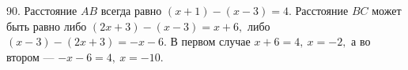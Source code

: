 90. Расстояние $AB$ всегда равно $(x+1)-(x-3)=4.$ Расстояние $BC$ может быть равно либо $(2x+3)-(x-3)=x+6,$ либо $(x-3)-(2x+3)=-x-6.$ В первом случае $x+6=4,\ x=-2,$ а во втором --- $-x-6=4,\ x=-10.$\\
